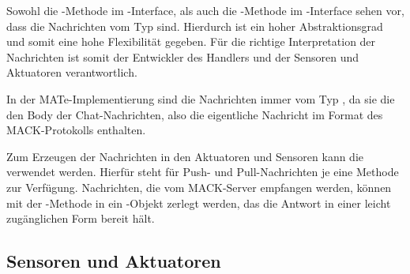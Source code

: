 Sowohl die -Methode im -Interface, als auch die -Methode im -Interface sehen vor, dass die Nachrichten vom Typ  sind. Hierdurch ist ein hoher Abstraktionsgrad und somit eine hohe Flexibilität gegeben. Für die richtige Interpretation der Nachrichten ist somit der Entwickler des Handlers und der Sensoren und Aktuatoren verantwortlich.

In der MATe-Implementierung sind die Nachrichten immer vom Typ , da sie die den Body der Chat-Nachrichten, also die eigentliche Nachricht im Format des MACK-Protokolls enthalten.

Zum Erzeugen der Nachrichten in den Aktuatoren und Sensoren kann die  verwendet werden. Hierfür steht für Push- und Pull-Nachrichten je eine Methode zur Verfügung. Nachrichten, die vom MACK-Server empfangen werden, können mit der -Methode in ein -Objekt zerlegt werden, das die Antwort in einer leicht zugänglichen Form bereit hält.

\subsection{Sensoren und Aktuatoren}\label{subsec:real_sensors}




